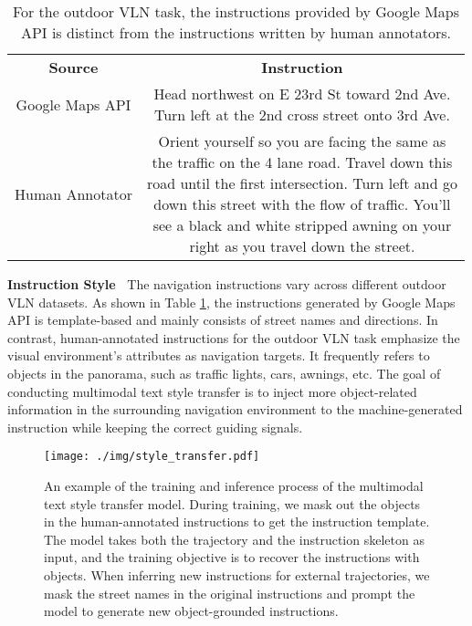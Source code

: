 \documentclass[11pt,a4paper]{article}
\begin{document}
\begin{table}
\begin{adjustbox}{width=\linewidth,center}
\begin{tabular}{c c }
\cmidrule[\heavyrulewidth]{1-2}
\textbf{Source} & \textbf{Instruction} \\ \cmidrule{1-2}
Google Maps API     & \makecell[l]{Head northwest on E 23rd St toward 2nd Ave.\\ Turn left at the 2nd cross street onto 3rd Ave. }\\ \cmidrule{1-2}
Human Annotator     & \makecell[l]{Orient yourself so you are facing the same as\\the traffic on the 4 lane road. Travel down this\\road until the first intersection. Turn left and go\\down this street with the flow of traffic. You'll\\see a black and white stripped awning on your\\right as you travel down the street.} \\ \cmidrule[\heavyrulewidth]{1-2}
\end{tabular}
\end{adjustbox}
\caption{For the outdoor VLN task, the instructions provided by Google Maps API is distinct from the instructions written by human annotators.}
\label{tab:instr_comparison}

\end{table}

\noindent\textbf{Instruction Style~}
\label{instr_style}
The navigation instructions vary across different outdoor VLN datasets. 
As shown in Table \ref{tab:instr_comparison}, the instructions generated by Google Maps API is template-based and mainly consists of street names and directions.
In contrast, human-annotated instructions for the outdoor VLN task emphasize the visual environment's attributes as navigation targets. It frequently refers to objects in the panorama, such as traffic lights, cars, awnings, etc. 
The goal of conducting multimodal text style transfer is to inject more object-related information in the surrounding navigation environment to the machine-generated instruction while keeping the correct guiding signals. 


\begin{figure*}[t]
\centering
\texttt{[image: ./img/style\_transfer.pdf]}
\caption{An example of the training and inference process of the multimodal text style transfer model. During training, we mask out the objects in the human-annotated instructions to get the instruction template. The model takes both the trajectory and the instruction skeleton as input, and the training objective is to recover the instructions with objects. When inferring new instructions for external trajectories, we mask the street names in the original instructions and prompt the model to generate new object-grounded instructions. }
\label{fig:style_transfer_process}
\end{figure*}
\end{document}
